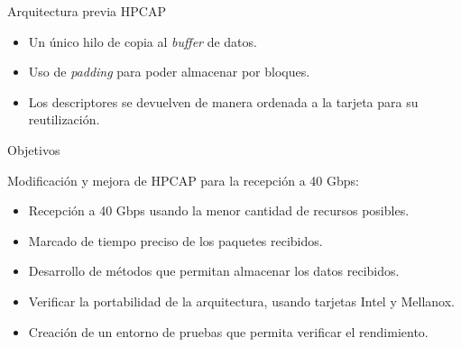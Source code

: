 \documentclass[10pt,notes,compress,usetitleprogressbar,aspectratio=1610]{beamer}
\begin{document}
\begin{frame}{Arquitectura previa HPCAP}


\begin{figure}[hbtp]
\centering

\end{figure}

\begin{itemize}
\item Un único hilo de copia al \textit{buffer} de datos.
\item Uso de \textit{padding} para poder almacenar por bloques. 
\item Los descriptores se devuelven de manera ordenada a la tarjeta para su reutilización.
\end{itemize}

\end{frame}


\begin{frame}{Objetivos}

Modificación y mejora de HPCAP para la recepción a 40 Gbps:

\begin{itemize}
\item Recepción a 40 Gbps usando la menor cantidad de recursos posibles.
\item Marcado de tiempo preciso de los paquetes recibidos.
\item Desarrollo de métodos que permitan almacenar los datos recibidos.
\item Verificar la portabilidad de la arquitectura, usando tarjetas Intel y Mellanox.
\item Creación de un entorno de pruebas que permita verificar el rendimiento.
\end{itemize}


\end{frame}
\end{document}
